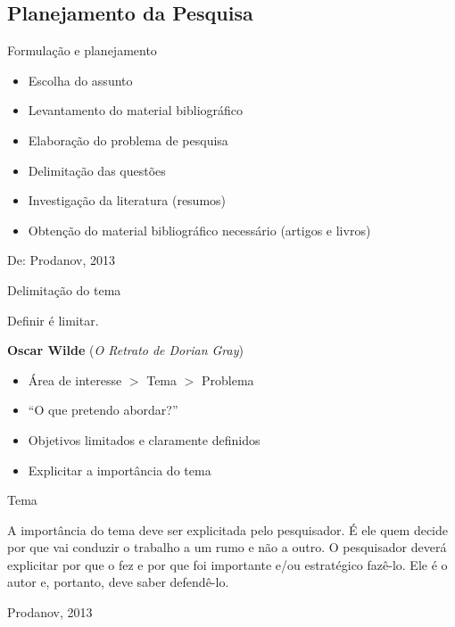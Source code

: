 \documentclass{beamer}
\begin{document}
\subsection{Planejamento da Pesquisa}

\begin{frame}{Formulação e planejamento}
  \begin{itemize}
    \footnotesize
  \item Escolha do assunto
    \bigskip
  \item Levantamento do material bibliográfico
    \bigskip
  \item Elaboração do problema de pesquisa
    \bigskip
  \item Delimitação das questões
    \bigskip
  \item Investigação da literatura (resumos)
    \bigskip
  \item Obtenção do material bibliográfico necessário (artigos e livros)
  \end{itemize}
  De: Prodanov, 2013
\end{frame}

\begin{frame}{Delimitação do tema}
  \begin{block}{}
    Definir é limitar.

    \bigskip
    \scriptsize
    \hfill {\bf Oscar Wilde} ({\em O Retrato de Dorian Gray})
  \end{block}
  \bigskip
  \begin{itemize}
    \footnotesize
  \item Área de interesse $>$ Tema $>$ Problema
  \item ``O que pretendo abordar?''
  \item Objetivos limitados e claramente definidos
  \item Explicitar a importância do tema
  \end{itemize}
\end{frame}

\begin{frame}{Tema}
  \begin{block}{}
    \footnotesize
    A importância do tema deve ser explicitada pelo pesquisador. É ele
    quem decide por que vai conduzir o trabalho a um rumo e não a
    outro. O pesquisador deverá explicitar por que o fez e por que foi
    importante e/ou estratégico fazê-lo. Ele é o autor e, portanto,
    deve saber defendê-lo.
  \end{block}

  \vfill
  \scriptsize
  \hfill Prodanov, 2013
\end{frame}
\end{document}
